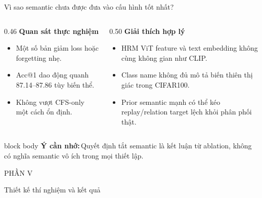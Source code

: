 \documentclass[aspectratio=169,10pt]{beamer}
\newcommand{\remember}[1]{%
  \par\vspace{0.12cm}%
  \begin{beamercolorbox}[wd=\linewidth,sep=0.11cm,leftskip=0.08cm,rightskip=0.08cm,rounded=true]{block body}
    \footnotesize\textbf{\color{HRMBlue}Ý cần nhớ:}\,\color{HRMDark}#1
  \end{beamercolorbox}
}
\newcommand{\sectionframe}[2]{%
  \begin{frame}[plain]
    \vfill
    {\large\color{HRMBlue}#1}\par\vspace{0.35cm}
    {\Huge\color{HRMDark}#2}\par
    \vfill
  \end{frame}
}
\begin{document}
\begin{frame}{Vì sao semantic chưa được đưa vào cấu hình tốt nhất?}
  \begin{columns}[T,onlytextwidth]
    \begin{column}{0.46\textwidth}
      {\large\bfseries Quan sát thực nghiệm}\par\vspace{0.25cm}
      \begin{itemize}\setlength\itemsep{0.25cm}
        \item Một số bản giảm loss hoặc forgetting nhẹ.
        \item Acc@1 dao động quanh 87.14--87.86 tùy biến thể.
        \item Không vượt CFS-only một cách ổn định.
      \end{itemize}
    \end{column}
    \begin{column}{0.50\textwidth}
      {\large\bfseries Giải thích hợp lý}\par\vspace{0.25cm}
      \begin{itemize}\setlength\itemsep{0.25cm}
        \item HRM ViT feature và text embedding không cùng không gian như CLIP.
        \item Class name không đủ mô tả biến thiên thị giác trong CIFAR100.
        \item Prior semantic mạnh có thể kéo replay/relation target lệch khỏi phân phối thật.
      \end{itemize}
    \end{column}
  \end{columns}
  \remember{Quyết định tắt semantic là kết luận từ ablation, không có nghĩa semantic vô ích trong mọi thiết lập.}
\end{frame}

\sectionframe{PHẦN V}{Thiết kế thí nghiệm và kết quả}
\end{document}

